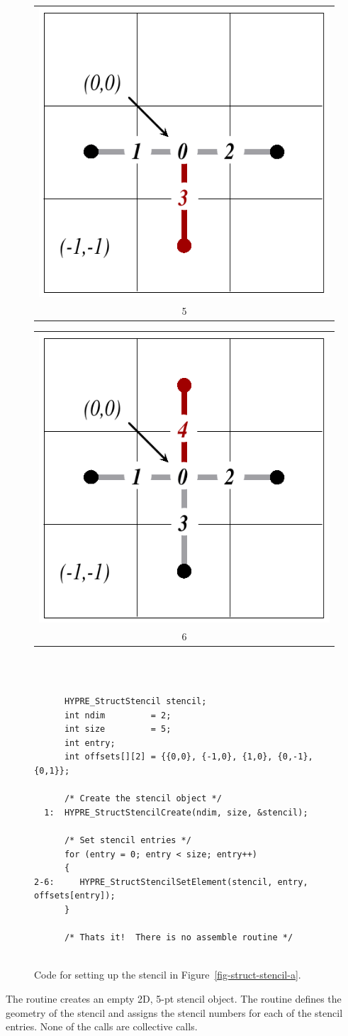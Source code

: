 \begin{figure}
\begin{tabular}{@{}c@{}}
\includegraphics[width=.22\textwidth]{figStructStenc5} \\ 5
\end{tabular}
\hfill
\begin{tabular}{@{}c@{}}
\includegraphics[width=.22\textwidth]{figStructStenc6} \\ 6
\end{tabular}
\hfill\mbox{}
\vspace{2em} \\
\begin{minipage}{0.85\textwidth}
\begin{verbatim}
      
      HYPRE_StructStencil stencil;
      int ndim         = 2;
      int size         = 5;
      int entry;
      int offsets[][2] = {{0,0}, {-1,0}, {1,0}, {0,-1}, {0,1}};
      
      /* Create the stencil object */
  1:  HYPRE_StructStencilCreate(ndim, size, &stencil);
      
      /* Set stencil entries */
      for (entry = 0; entry < size; entry++)
      {
2-6:     HYPRE_StructStencilSetElement(stencil, entry, offsets[entry]);
      }
      
      /* Thats it!  There is no assemble routine */
      
\end{verbatim}
\end{minipage}
\caption{%
Code for setting up the stencil in Figure~\ref{fig-struct-stencil-a}.}
\label{fig-struct-stencil-b}
\end{figure}
The  routine creates an empty 2D, 5-pt stencil object.  The
 routine defines the geometry of the stencil and assigns the
stencil numbers for each of the stencil entries.  None of the calls are
collective calls.


